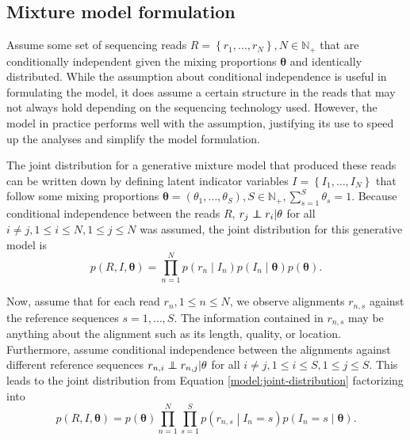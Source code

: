\documentclass[officiallayout]{tktla}
\newcommand\indept{\protect\mathpalette{\protect\independenT}{\perp}}
\def\independenT#1#2{\mathrel{\rlap{$#1#2$}\mkern2mu{#1#2}}}
\begin{document}
\subsection{Mixture model formulation}
Assume some set of sequencing reads $R = \left\{r_{1}, \dots,
r_{N}\right\}, N \in \mathbb{N}_{+}$ that are conditionally
independent given the mixing proportions $\mathbf{\theta}$ and
identically distributed. While the assumption about conditional
independence is useful in formulating the model, it does assume a
certain structure in the reads that may not always hold depending on
the sequencing technology used. However, the model in practice
performs well with the assumption, justifying its use to speed up the
analyses and simplify the model formulation.

The joint distribution for a generative mixture model that produced
these reads can be written down by defining latent indicator variables
$I = \left\{I_{1}, \dots, I_{N}\right\}$ that follow some mixing
proportions $\boldsymbol{\theta} = \left(\theta_{1}, \dots,
\theta_{S}\right), S \in \mathbb{N}_{+}, \sum_{s = 1}^{S} \theta_{s} =
1$. Because conditional independence between the reads $R$, $r_{j}
\indept r_{i} | \mathbf{\theta}$ for all $i \neq j, 1 \leq i \leq N, 1
\leq j \leq N$ was assumed, the joint distribution for this generative
model is
\begin{equation}
  \label{model:joint-distribution}
  p\left(R, I, \boldsymbol\theta\right) = \prod_{n = 1}^{N}p\left(r_{n} \middle| I_{n}\right) p\left(I_{n} \middle| \boldsymbol\theta\right)p\left(\boldsymbol\theta\right).
\end{equation}

Now, assume that for each read $r_{n}, 1 \leq n \leq N$, we observe
alignments $r_{n, s}$ against the reference sequences $s = 1, \dots,
S$. The information contained in $r_{n, s}$ may be anything about the
alignment such as its length, quality, or location. Furthermore,
assume conditional independence between the alignments against different reference
sequences $r_{n, i} \indept r_{n, j} | \mathbf{\theta}$ for all $i
\neq j, 1 \leq i \leq S, 1 \leq j \leq S$. This leads to the joint
distribution from Equation \ref{model:joint-distribution} factorizing
into
\begin{equation}
  \label{model:joint-distribution-factorized}
  p\left(R, I, \boldsymbol\theta\right) = p\left(\boldsymbol\theta\right)\prod_{n = 1}^{N} \prod_{s = 1}^{S} p\left(r_{n, s} \middle| I_{n} = s\right) p\left(I_{n} = s \middle| \boldsymbol\theta\right).
\end{equation}
\end{document}
